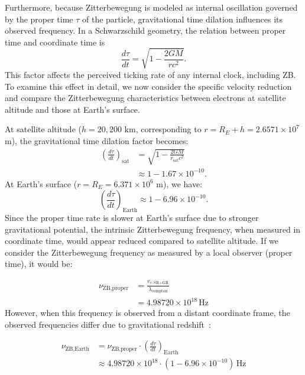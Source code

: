 \documentclass[%
 reprint,
 amsmath,amssymb,
 aps,
]{revtex4-1}
\numberwithin{equation}{section}%
\begin{document}
Furthermore, because Zitterbewegung is modeled as internal oscillation governed by the proper time $\tau$ of the particle, gravitational time dilation influences its observed frequency. In a Schwarzschild geometry, the relation between proper time and coordinate time is
\begin{equation}
\frac{d\tau}{dt} = \sqrt{1 - \frac{2GM}{rc^2}}.
\end{equation}
This factor affects the perceived ticking rate of any internal clock, including ZB. To examine this effect in detail, we now consider the specific velocity reduction and compare the Zitterbewegung characteristics between electrons at satellite altitude and those at Earth's surface.

At satellite altitude ($h = 20,200$ km, corresponding to $r = R_E + h = 2.6571 \times 10^7$ m), the gravitational time dilation factor becomes:
\begin{equation}
\begin{aligned}
\left( \frac{d\tau}{dt} \right)_{\text{sat}} &= \sqrt{1 - \frac{2GM}{r_{\text{sat}}c^2}} \\
&\approx 1 - 1.67 \times 10^{-10}.
\end{aligned}
\end{equation}
At Earth's surface ($r = R_E = 6.371 \times 10^6$ m), we have:
\begin{equation}
\left( \frac{d\tau}{dt} \right)_{\text{Earth}} \approx 1 - 6.96 \times 10^{-10}.
\end{equation}
Since the proper time rate is slower at Earth's surface due to stronger gravitational potential, the intrinsic Zitterbewegung frequency, when measured in coordinate time, would appear reduced compared to satellite altitude. If we consider the Zitterbewegung frequency as measured by a local observer (proper time), it would be:

\begin{equation}
\begin{aligned}
\nu_{\text{ZB,proper}} &= \frac{v_{e,\text{SR+GR}}}{\lambda_{\mathrm{compton}}} \\
&= 4.98720 \times 10^{18} \, \text{Hz}
\end{aligned}
\end{equation}
However, when this frequency is observed from a distant coordinate frame, the observed frequencies differ due to gravitational redshift~\cite{pound1960}:

\begin{equation}
\begin{aligned}
\nu_{\text{ZB,Earth}} &= \nu_{\text{ZB,proper}} \cdot \left( \frac{d\tau}{dt} \right)_{\text{Earth}} \\
&\approx 4.98720 \times 10^{18} \cdot (1 - 6.96 \times 10^{-10}) \, \text{Hz}
\end{aligned}
\end{equation}
\end{document}
